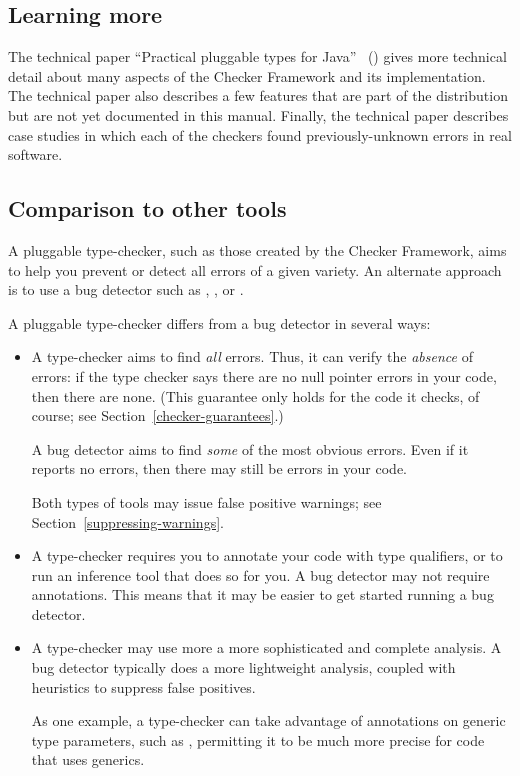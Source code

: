 \subsection{Learning more}

The technical paper ``Practical pluggable types for Java''~\cite{PapiACPE2008}
()
gives more technical detail about many
aspects of the Checker Framework and its implementation.
%
The technical paper also describes a few features that are part of the
distribution but are not yet documented in this manual.
%
Finally, the technical
paper describes case
studies in which each of the checkers found
previously-unknown errors in real software.


\subsection{Comparison to other tools\label{other-tools}}

A pluggable type-checker, such as those created by the Checker Framework,
aims to help you prevent or detect all errors of a given variety.  An
alternate approach is to use a bug detector such as
,
, or
.

A pluggable type-checker
differs from a bug detector in several ways:
\begin{itemize}
\item
  A type-checker aims to find \emph{all} errors.  Thus, it can verify the
  \emph{absence} of errors:  if the type checker says there are no null
  pointer errors in your code, then there are none.  (This guarantee only
  holds for the code it checks, of course; see
  Section~\ref{checker-guarantees}.)

  A bug detector aims to find \emph{some} of the most obvious errors.  Even
  if it reports no errors, then there may still be errors in your code.

  Both types of tools may issue false positive warnings; see
  Section~\ref{suppressing-warnings}.

\item
  A type-checker requires you to annotate your code with type qualifiers,
  or to run an inference tool that does so for you.  A bug detector may not
  require annotations.  This means that it may be easier to get started
  running a bug detector.

\item
  A type-checker may use more a more sophisticated and complete analysis.
  A bug detector typically does a more lightweight analysis, coupled with
  heuristics to suppress false positives.

  As one example, a type-checker can take advantage of annotations on
  generic type parameters, such as , permitting
  it to be much more precise for code that uses generics.

\end{itemize}

